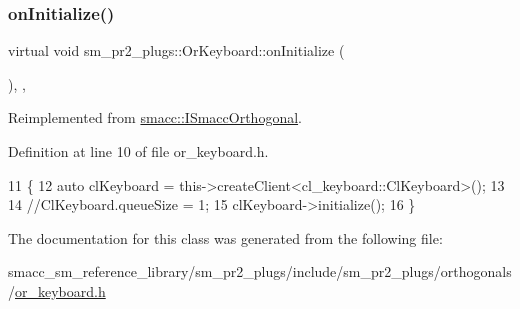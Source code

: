 \subsubsection{\texorpdfstring{on\+Initialize()}{onInitialize()}}
{\footnotesize\ttfamily virtual void sm\+\_\+pr2\+\_\+plugs\+::\+Or\+Keyboard\+::on\+Initialize (\begin{DoxyParamCaption}{ }\end{DoxyParamCaption})\hspace{0.3cm}{\ttfamily [inline]}, {\ttfamily [override]}, {\ttfamily [virtual]}}



Reimplemented from \hyperlink{classsmacc_1_1ISmaccOrthogonal_a6bb31c620cb64dd7b8417f8705c79c7a}{smacc\+::\+I\+Smacc\+Orthogonal}.



Definition at line 10 of file or\+\_\+keyboard.\+h.


\begin{DoxyCode}
11     \{
12         \textcolor{keyword}{auto} clKeyboard = this->createClient<cl\_keyboard::ClKeyboard>();
13         
14         \textcolor{comment}{//ClKeyboard.queueSize = 1;}
15         clKeyboard->initialize();
16     \}
\end{DoxyCode}


The documentation for this class was generated from the following file\+:\begin{DoxyCompactItemize}
\item 
smacc\+\_\+sm\+\_\+reference\+\_\+library/sm\+\_\+pr2\+\_\+plugs/include/sm\+\_\+pr2\+\_\+plugs/orthogonals/\hyperlink{sm__pr2__plugs_2include_2sm__pr2__plugs_2orthogonals_2or__keyboard_8h}{or\+\_\+keyboard.\+h}\end{DoxyCompactItemize}
